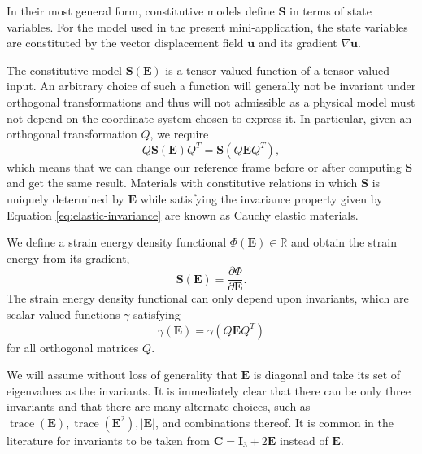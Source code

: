 In their most general form, constitutive models define $\mathbf S$ in terms of state variables.
For the model used in the present mini-application, the state variables are constituted by the vector displacement field $\mathbf u$ and its gradient $\nabla \mathbf u$.

The constitutive model $\mathbf S \left( \mathbf E \right)$ is a tensor-valued function of a tensor-valued input.
An arbitrary choice of such a function will generally not be invariant under orthogonal transformations and thus will not admissible as a physical model must not depend on the coordinate system chosen to express it.
In particular, given an orthogonal transformation $Q$, we require
\begin{equation}
   Q \mathbf S \left( \mathbf E \right) Q^T = \mathbf S \left( Q \mathbf E Q^T \right),
   \label{eq:elastic-invariance}
\end{equation}
which means that we can change our reference frame before or after computing $\mathbf S$ and get the same result.
Materials with constitutive relations in which $\mathbf S$ is uniquely determined by $\mathbf E$ while satisfying the invariance property given by Equation \ref{eq:elastic-invariance} are known as Cauchy elastic materials.

We define a strain energy density functional $\Phi \left( \mathbf E \right) \in \mathbb{R}$ and obtain the strain energy from its gradient,
\begin{equation}
\mathbf S \left( \mathbf E \right) = \frac{\partial \Phi}{\partial \mathbf E}.
\label{eq:strain-energy-grad}
\end{equation}
The strain energy density functional can only depend upon invariants, which are scalar-valued functions $\gamma$ satisfying
\begin{equation}
\gamma \left( \mathbf E \right) = \gamma \left( Q \mathbf{E} Q^T \right)
\end{equation}
for all orthogonal matrices $Q$.

We will assume without loss of generality that $\mathbf E$ is diagonal and take its set of eigenvalues as the invariants.
It is immediately clear that there can be only three invariants and that there are many alternate choices, such as $\operatorname{trace}(\mathbf E), \operatorname{trace}(\mathbf E^2), \lvert \mathbf E \rvert$, and combinations thereof.
It is common in the literature for invariants to be taken from $\mathbf C = \mathbf I_3 + 2 \mathbf E$ instead of $\mathbf E$.

